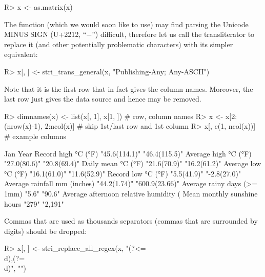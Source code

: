 \documentclass[nojss]{jss}
\begin{document}
\begin{Schunk}
\begin{Sinput}
R> x <- as.matrix(x)
\end{Sinput}
\end{Schunk}

The  function (which we would soon like to use)
may find parsing the Unicode MINUS SIGN (U+2212, ``−'') difficult,
therefore let us call the transliterator to replace it
(and other potentially problematic characters) with its simpler equivalent:

\begin{Schunk}
\begin{Sinput}
R> x[, ] <- stri_trans_general(x, "Publishing-Any; Any-ASCII")
\end{Sinput}
\end{Schunk}

Note that it is the first row that in fact gives the column names.
Moreover, the last row just gives the data source and hence may be removed.

\begin{Schunk}
\begin{Sinput}
R> dimnames(x) <- list(x[, 1], x[1, ])  # row, column names
R> x <- x[2:(nrow(x)-1), 2:ncol(x)]     # skip 1st/last row and 1st column
R> x[, c(1, ncol(x))]  # example columns
\end{Sinput}
\begin{Soutput}
                                        Jan           Year
Record high °C (°F)                     "45.6(114.1)" "46.4(115.5)"
Average high °C (°F)                    "27.0(80.6)"  "20.8(69.4)"
Daily mean °C (°F)                      "21.6(70.9)"  "16.2(61.2)"
Average low °C (°F)                     "16.1(61.0)"  "11.6(52.9)"
Record low °C (°F)                      "5.5(41.9)"   "-2.8(27.0)"
Average rainfall mm (inches)            "44.2(1.74)"  "600.9(23.66)"
Average rainy days (>= 1mm)             "5.6"         "90.6"
Average afternoon relative humidity (%) "47"          "51"
Mean monthly sunshine hours             "279"         "2,191"
\end{Soutput}
\end{Schunk}

Commas that are used as thousands separators (commas that are surrounded
by digits) should be dropped:

\begin{Schunk}
\begin{Sinput}
R> x[, ] <- stri_replace_all_regex(x, "(?<=\\d),(?=\\d)", "")
\end{Sinput}
\end{Schunk}
\end{document}

